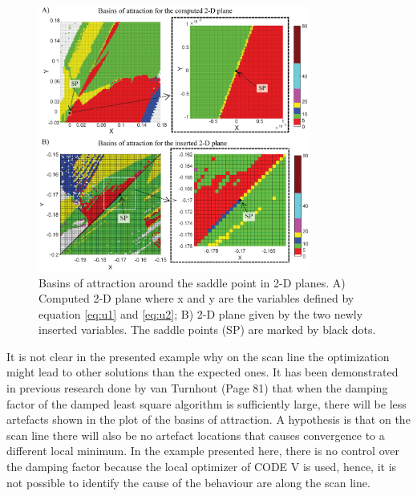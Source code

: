 \begin{figure}[h!]
    \centering
    \includegraphics[width=0.8\textwidth]{chapter-4/figures/Basins_two_situations.png}
    \caption{Basins of attraction around the saddle point in 2-D planes. A) Computed 2-D plane where x and y are the variables defined by equation \ref{eq:u1} and \ref{eq:u2}; B) 2-D plane given by the two newly inserted variables. The saddle points (SP) are marked by black dots.}
    \label{fig:basins}
\end{figure}

It is not clear in the presented example why on the scan line the optimization might lead to other solutions than the expected ones. It has been demonstrated in previous research done by van Turnhout \cite{vanTurnhoutThesis2009} (Page 81)\cite{vanTurnhout2009_landscape_instab} that when the damping factor of the damped least square algorithm is sufficiently large, there will be less artefacts shown in the plot of the basins of attraction. A hypothesis is that on the scan line there will also be no artefact locations that causes convergence to a different local minimum. In the example presented here, there is no control over the damping factor because the local optimizer of CODE V is used, hence, it is not possible to identify the cause of the behaviour are along the scan line. 

